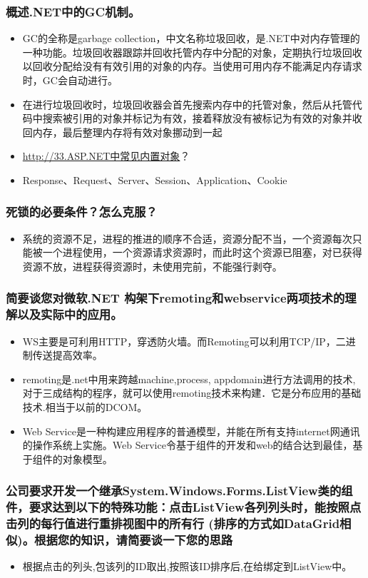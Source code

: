 \documentclass[9pt, b5paper]{article}
\begin{document}
\subsubsection{概述.NET中的GC机制。}
\label{sec-1-2-120}
\begin{itemize}
\item GC的全称是garbage collection，中文名称垃圾回收，是.NET中对内存管理的一种功能。垃圾回收器跟踪并回收托管内存中分配的对象，定期执行垃圾回收以回收分配给没有有效引用的对象的内存。当使用可用内存不能满足内存请求时，GC会自动进行。
\item 在进行垃圾回收时，垃圾回收器会首先搜索内存中的托管对象，然后从托管代码中搜索被引用的对象并标记为有效，接着释放没有被标记为有效的对象并收回内存，最后整理内存将有效对象挪动到一起
\item \url{http://33.ASP.NET中常见内置对象}？
\item Response、Request、Server、Session、Application、Cookie
\end{itemize}
\subsubsection{死锁的必要条件？怎么克服？}
\label{sec-1-2-121}
\begin{itemize}
\item 系统的资源不足，进程的推进的顺序不合适，资源分配不当，一个资源每次只能被一个进程使用，一个资源请求资源时，而此时这个资源已阻塞，对已获得资源不放，进程获得资源时，未使用完前，不能强行剥夺。
\end{itemize}
\subsubsection{简要谈您对微软.NET 构架下remoting和webservice两项技术的理解以及实际中的应用。}
\label{sec-1-2-122}
\begin{itemize}
\item WS主要是可利用HTTP，穿透防火墙。而Remoting可以利用TCP/IP，二进制传送提高效率。
\item remoting是.net中用来跨越machine,process, appdomain进行方法调用的技术,对于三成结构的程序，就可以使用remoting技术来构建．它是分布应用的基础技术.相当于以前的DCOM。
\item Web Service是一种构建应用程序的普通模型，并能在所有支持internet网通讯的操作系统上实施。Web Service令基于组件的开发和web的结合达到最佳，基于组件的对象模型。
\end{itemize}
\subsubsection{公司要求开发一个继承System.Windows.Forms.ListView类的组件，要求达到以下的特殊功能：点击ListView各列列头时，能按照点击列的每行值进行重排视图中的所有行 (排序的方式如DataGrid相似)。根据您的知识，请简要谈一下您的思路}
\label{sec-1-2-123}
\begin{itemize}
\item 根据点击的列头,包该列的ID取出,按照该ID排序后,在给绑定到ListView中。
\end{itemize}
\end{document}
